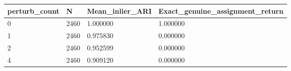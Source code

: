 \begin{tabular}{llll}
\toprule
perturb\_count & N & Mean\_inlier\_ARI & Exact\_genuine\_assignment\_return \\
\midrule
0 & 2460 & 1.000000 & 1.000000 \\
1 & 2460 & 0.975830 & 0.000000 \\
2 & 2460 & 0.952599 & 0.000000 \\
4 & 2460 & 0.909120 & 0.000000 \\
\bottomrule
\end{tabular}
